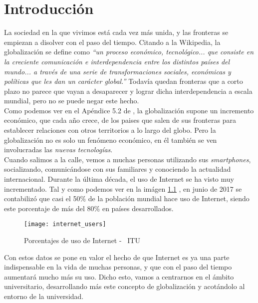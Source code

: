 \chapter{Introducción}
\label{ch:introduccion}
La sociedad en la que vivimos está cada vez más unida, y las fronteras se empiezan a disolver con el paso del tiempo. Citando a la Wikipedia, la globalización \cite{globalizacion} se define como \textit{``un proceso económico, tecnológico... que consiste en la creciente comunicación e interdependencia entre los distintos países del mundo... a través de una serie de transformaciones sociales, económicas y políticas que les dan un carácter global.''} Todavía quedan fronteras que a corto plazo no parece que vayan a desaparecer y lograr dicha interdependencia a escala mundial, pero no se puede negar este hecho.\\

Como podemos ver en el Apéndice 5.2 de \cite{globalreport}, la globalización supone un incremento económico, que cada año crece, de los paises que salen de sus fronteras para establecer relaciones con otros territorios a lo largo del globo. Pero la globalización no es solo un fenómeno económico, en él también se ven involucradas las \textit{nuevas tecnologías}.\\

Cuando salimos a la calle, vemos a muchas personas utilizando sus \textit{smartphones}, socializando, comunicándose con sus familiares y conociendo la actualidad internacional. Durante la última década, el uso de Internet se ha visto muy incrementado. Tal y como podemos ver en la imágen \ref{internetusageimagen} , en junio de 2017 se contabilizó que casi el 50\% de la población mundial hace uso de Internet, siendo este porcentaje de más del 80\% en países desarrollados.\\

\begin{figure}
    \centering
    \texttt{[image: internet\_users]}
    \caption{Porcentajes de uso de Internet - \textcopyright\ ITU \cite{internetusage}}
    \label{internetusageimagen}
\end{figure}

Con estos datos se pone en valor el hecho de que Internet es ya una parte indispensable en la vida de muchas personas, y que con el paso del tiempo aumentará mucho más su uso. Dicho esto, vamos a centrarnos en el ámbito universitario, desarrollando más este concepto de globalización y acotándolo al entorno de la universidad.\\\\

